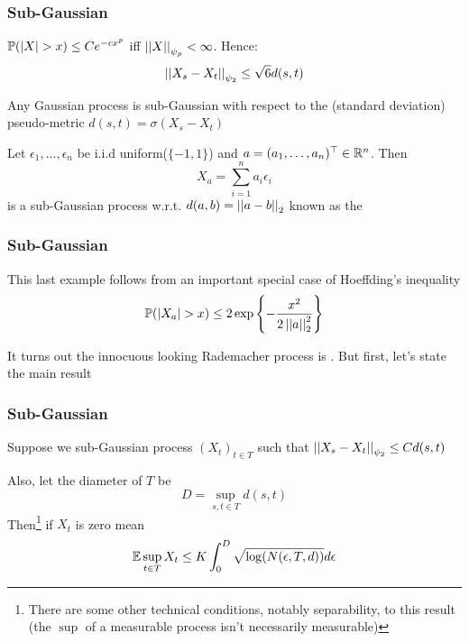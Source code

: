 \documentclass[12pt]{beamer}
\begin{document}
\begin{frame}[fragile]
\frametitle{Sub-Gaussian}
 $\P(|X| > x) \leq C e^{-cx^p}$ iff $\norm{X}_{\psi_p} < \infty$.  Hence:
\[
\norm{X_s -X_t}_{\psi_2} \leq \sqrt{6} d(s,t)
\]

\vsp
{} Any Gaussian process is sub-Gaussian with respect to the (standard deviation) 
pseudo-metric $d(s,t) = \sigma(X_s - X_t)$ 

\vsp
{} Let $\epsilon_1,\ldots,\epsilon_n$ be i.i.d uniform($\{-1,1\}$) and $a = (a_1,\ldots,a_n)^{\top} \in \R^n$.  Then
\[
X_a = \sum_{i=1}^n a_i \epsilon_i
\]
is a sub-Gaussian process w.r.t. $d(a,b) = \norm{a-b}_2$ known as the 
\end{frame}

\begin{frame}[fragile]
\frametitle{Sub-Gaussian}
This last example follows from an important special case of Hoeffding's inequality
\[
\P(|X_a| > x) \leq 2 \exp\left\{ -\frac{x^2}{2\norm{a}_2^2}\right\}
\]

\vsp
It turns out the innocuous looking Rademacher process is .  But first, let's state the
main result
\end{frame}



\begin{frame}[fragile]
\frametitle{Sub-Gaussian}
Suppose we sub-Gaussian process $(X_t)_{t\in T}$ such that $\norm{X_s -X_t}_{\psi_2} \leq C d(s,t)$

\vsp
Also, let the diameter of $T$ be 
\[
D = \sup_{s,t \in T} d(s,t)
\]
Then\footnote{There are some other technical conditions, notably separability,
to this result (the $\sup$ of a measurable process
isn't necessarily measurable)} if $X_t$ is zero mean
\[
\E \sup_{t \in T} X_t \leq K\int_0^D \sqrt{\log(N(\epsilon,T,d))} d\epsilon
\]
\end{frame}
\end{document}
